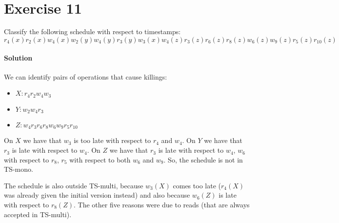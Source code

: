 \section{Exercise 11}

Classify the following schedule with respect to timestamps: 
\[r_4(x) r_2(x) w_4(x) w_2(y) w_4(y) r_3(y) w_3(x) w_4(z) r_3(z) r_6(z) r_8(z) w_6(z) w_9(z) r_5(z) r_{10}(z)\]

\paragraph*{Solution}
We can identify pairs of operations that cause killings:
\begin{itemize}
    \item $X: r_4 r_2 w_4 w_3$
    \item $Y: w_2 w_4 r_3$
    \item $Z: w_4 r_3 r_6 r_8 w_6 w_9 r_5 r_{10}$
\end{itemize}
On $X$ we have that $w_3$ is too late with respect to $r_4$ and $w_4$. On $Y$ we have that $r_3$ is late with respect to $w_4$. 
On $Z$ we have that $r_3$ is late with respect to $w_4$, $w_6$ with respect to $r_8$, $r_5$ with respect to both $w_6$ and $w_9$. 
So, the schedule is not in TS-mono. 

The schedule is also outside TS-multi, because $w_3(X)$ comes too late ($r_4(X)$ was already given the initial version instead) and also because $w_6(Z)$ is late with respect to $r_8(Z)$. 
The other five reasons were due to reads (that are always accepted in TS-multi).